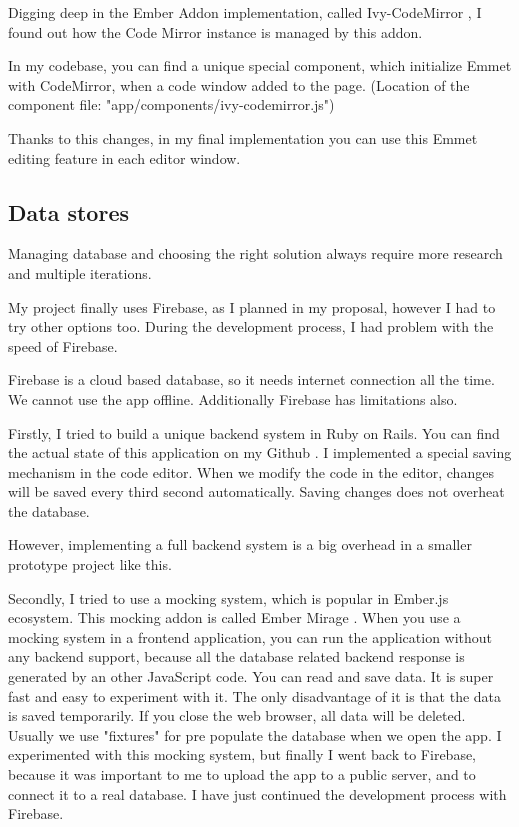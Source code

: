 \documentclass[11pt, a4paper, oneside, openright, medskipamount]{report}
\begin{document}
Digging deep in the Ember Addon implementation, called Ivy-CodeMirror \cite{ivy-codemirror}, I found out how the Code Mirror instance is managed by this addon.

In my codebase, you can find a unique special component, which initialize Emmet with CodeMirror, when a code window added to the page. (Location of the component file: "app/components/ivy-codemirror.js")

Thanks to this changes, in my final implementation you can use this Emmet editing feature in each editor window.

\subsection{Data stores}

Managing database and choosing the right solution always require more research and multiple iterations.

My project finally uses Firebase, as I planned in my proposal, however I had to try other options too. During the development process, I had problem with the speed of Firebase.

Firebase is a cloud based database, so it needs internet connection all the time. We cannot use the app offline. Additionally Firebase has limitations also.

Firstly, I tried to build a unique backend system in Ruby on Rails. You can find the actual state of this application on my Github \cite{tutorial-builder-backend}. I implemented a special saving mechanism in the code editor. When we modify the code in the editor, changes will be saved every third second automatically. Saving changes does not overheat the database.

However, implementing a full backend system is a big overhead in a smaller prototype project like this.

Secondly, I tried to use a mocking system, which is popular in Ember.js ecosystem. This mocking addon is called Ember Mirage \cite{ember-mirage}. When you use a mocking system in a frontend application, you can run the application without any backend support, because all the database related backend response is generated by an other JavaScript code. You can read and save data. It is super fast and easy to experiment with it. The only disadvantage of it is that the data is saved temporarily. If you close the web browser, all data will be deleted. Usually we use "fixtures" for pre populate the database when we open the app. I experimented with this mocking system, but finally I went back to Firebase, because it was important to me to upload the app to a public server, and to connect it to a real database. I have just continued the development process with Firebase.
\end{document}
